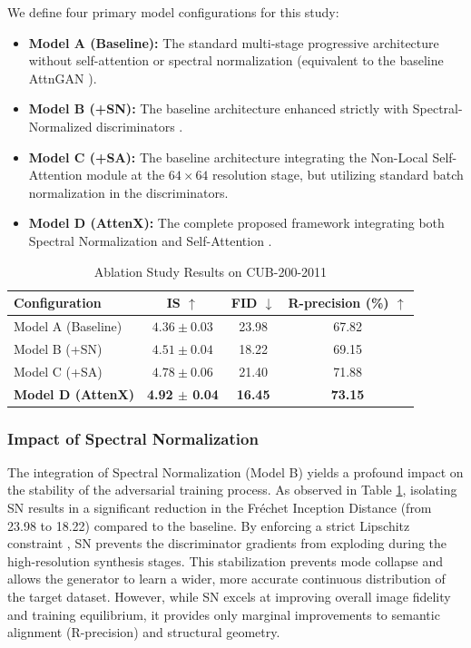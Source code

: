 \documentclass[conference]{IEEEtran}
\begin{document}
We define four primary model configurations for this study:
\begin{itemize}
    \item \textbf{Model A (Baseline):} The standard multi-stage progressive architecture without self-attention or spectral normalization (equivalent to the baseline AttnGAN \cite{xu2018attngan}).
    \item \textbf{Model B (+SN):} The baseline architecture enhanced strictly with Spectral-Normalized discriminators \cite{miyato2018spectral}.
    \item \textbf{Model C (+SA):} The baseline architecture integrating the Non-Local Self-Attention module \cite{wang2018nonlocal, zhang2019selfattention} at the $64 \times 64$ resolution stage, but utilizing standard batch normalization \cite{ioffe2015batch} in the discriminators.
    \item \textbf{Model D (AttenX):} The complete proposed framework integrating both Spectral Normalization \cite{miyato2018spectral} and Self-Attention \cite{wang2018nonlocal, zhang2019selfattention}.
\end{itemize}

\begin{table}[htbp]
\caption{Ablation Study Results on CUB-200-2011}
\label{tab:ablation}
\centering
\renewcommand{\arraystretch}{1.2}
\begin{tabular}{l c c c}
\hline
\textbf{Configuration} & \textbf{IS} $\uparrow$ & \textbf{FID} $\downarrow$ & \textbf{R-precision (\%)} $\uparrow$ \\
\hline
Model A (Baseline) & $4.36 \pm 0.03$ & 23.98 & 67.82 \\
Model B (+SN) & $4.51 \pm 0.04$ & 18.22 & 69.15 \\
Model C (+SA) & $4.78 \pm 0.06$ & 21.40 & 71.88 \\
\textbf{Model D (AttenX)} & \textbf{4.92 $\pm$ 0.04} & \textbf{16.45} & \textbf{73.15} \\
\hline
\end{tabular}
\end{table}

\subsubsection{Impact of Spectral Normalization}
The integration of Spectral Normalization \cite{miyato2018spectral} (Model B) yields a profound impact on the stability of the adversarial training process. As observed in Table \ref{tab:ablation}, isolating SN results in a significant reduction in the Fr\'{e}chet Inception Distance \cite{heusel2017gans} (from 23.98 to 18.22) compared to the baseline. By enforcing a strict Lipschitz constraint \cite{arjovsky2017wasserstein}, SN prevents the discriminator gradients from exploding during the high-resolution synthesis stages. This stabilization prevents mode collapse and allows the generator to learn a wider, more accurate continuous distribution of the target dataset. However, while SN excels at improving overall image fidelity and training equilibrium, it provides only marginal improvements to semantic alignment (R-precision) and structural geometry.
\end{document}
